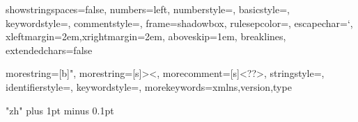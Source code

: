 \usepackage[slantfont,boldfont]{xeCJK}

\usepackage{geometry}
\usepackage{enumerate}
\usepackage[
	pdfstartview=FitH,
	CJKbookmarks=true,
	bookmarks=true,
	bookmarksnumbered=true,
	bookmarksopen=true,
	colorlinks=true,
	citecolor=blue,
	linkcolor=blue,
	anchorcolor=green,
	urlcolor=blue]{hyperref}
\usepackage{titlesec}
\usepackage{booktabs}
\usepackage{titletoc}
\usepackage{indentfirst}
\usepackage{fontspec}
\usepackage{xunicode}
\usepackage{xltxtra}
\usepackage{color}
\usepackage{xcolor}
\usepackage{graphicx}
\usepackage{subfig}

\usepackage{fancyhdr}
\pagestyle{plain}

\usepackage{listings}
\lstloadlanguages{}
\lstset
{
	showstringspaces=false,
	numbers=left,
	numberstyle=\tiny,
	basicstyle=\ttfamily,
	keywordstyle=\color{blue!70},
	commentstyle=\color{red!50!green!50!blue!50},
	frame=shadowbox,
	rulesepcolor=\color{red!20!green!20!blue!20},
	escapechar=`,
	xleftmargin=2em,xrightmargin=2em, aboveskip=1em,
	breaklines,
	extendedchars=false
}

{
	morestring=[b]",
	morestring=[s]{>}{<},
	morecomment=[s]{<?}{?>},
	stringstyle=\color{black},
	identifierstyle=\color{blue},
	keywordstyle=\color{cyan},
	morekeywords={xmlns,version,type}%
}

\usepackage[title,titletoc,header]{appendix}

\usepackage{pgf,tikz}
\usetikzlibrary{shapes,automata,snakes,backgrounds,arrows}
\usetikzlibrary{mindmap}



\XeTeXlinebreaklocale "zh"
\XeTeXlinebreakskip=0pt plus 1pt minus 0.1pt



\setmainfont[BoldFont={Microsoft YaHei Bold}]{Microsoft YaHei}
\setmonofont{Monaco}
\setsansfont[BoldFont={Microsoft YaHei Bold}]{Microsoft YaHei}

\geometry{left=2.75cm,right=2.5cm,top=2.5cm,bottom=2.5cm}

\renewcommand{\contentsname}{目录}     
\renewcommand{\abstractname}{摘要}
\renewcommand{\indexname}{索引}
\renewcommand{\listfigurename}{插图目录}
\renewcommand{\listtablename}{表格目录}
\renewcommand{\figurename}{图}
\renewcommand{\tablename}{表}
\renewcommand{\lstlistingname}{例程}
\renewcommand{\appendixname}{附录}
\renewcommand{\appendixpagename}{附录}
\renewcommand{\appendixtocname}{附录}
\renewcommand\refname{参考文献}


